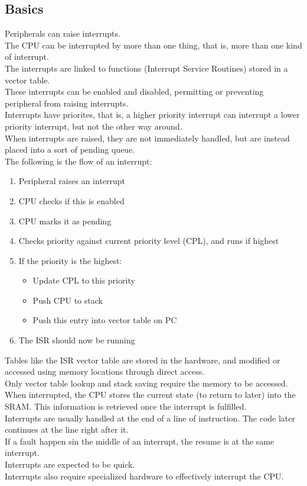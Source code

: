 \documentclass[nobib]{tufte-handout}
\begin{document}
\subsection{Basics}
Peripherals can raise interrupts.\\
The CPU can be interrupted by more than one thing, that is, more than one kind of interrupt.\\
The interrupts are linked to functions (Interrupt Service Routines) stored in a vector table.\\
These interrupts can be enabled and disabled, permitting or preventing peripheral from raising interrupts.\\
Interrupts have priorites, that is, a higher priority interrupt can interrupt a lower priority interrupt, but not the other way around.\\
When interrupts are raised, they are not immediately handled, but are instead placed into a sort of pending queue.\\
The following is the flow of an interrupt:\\
\begin{enumerate}
    \item Peripheral raises an interrupt
    \item CPU checks if this is enabled
    \item CPU marks it as pending
    \item Checks priority against current priority level (CPL), and runs if highest
    \item If the priority is the highest:
    \begin{itemize}
        \item Update CPL to this priority
        \item Push CPU to stack
        \item Push this entry into vector table on PC
    \end{itemize}
    \item The ISR should now be running
\end{enumerate}
Tables like the ISR vector table are stored in the hardware, and modified or accessed using memory locations through direct access.\\
Only vector table lookup and stack saving require the memory to be accessed.\\
When interrupted, the CPU stores the current state (to return to later) into the SRAM. This information is retrieved once the interrupt is fulfilled.\\
Interrupts are usually handled at the end of a line of instruction. The code later continues at the line right after it.\\
If a fault happen sin the middle of an interrupt, the resume is at the same interrupt.\\
Interrupts are expected to be quick.\\
Interrupts also require specialized hardware to effectively interrupt the CPU.\\
\end{document}
